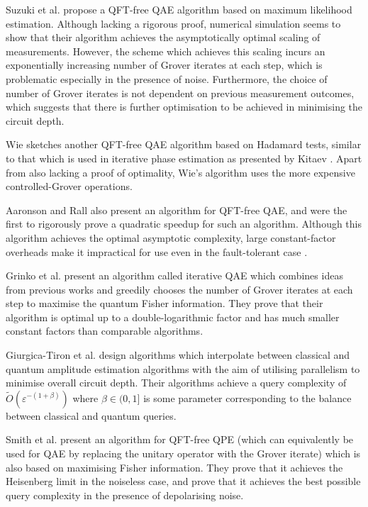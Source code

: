 Suzuki et al. \cite{Amplitude estimation without phase estimation} propose a QFT-free QAE algorithm based on maximum likelihood estimation. Although lacking a rigorous proof, numerical simulation seems to show that their algorithm achieves the asymptotically optimal scaling of measurements. However, the scheme which achieves this scaling incurs an exponentially increasing number of Grover iterates at each step, which is problematic especially in the presence of noise. Furthermore, the choice of number of Grover iterates is not dependent on previous measurement outcomes, which suggests that there is further optimisation to be achieved in minimising the circuit depth.

Wie \cite{Simpler Quantum Counting} sketches another QFT-free QAE algorithm based on Hadamard tests, similar to that which is used in iterative phase estimation as presented by Kitaev \cite{Quantum measurements and the Abelian Stabilizer Problem}. Apart from also lacking a proof of optimality, Wie's algorithm uses the more expensive controlled-Grover operations.

Aaronson and Rall \cite{Quantum Approximate Counting Simplified} also present an algorithm for QFT-free QAE, and were the first to rigorously prove a quadratic speedup for such an algorithm. Although this algorithm achieves the optimal asymptotic complexity, large constant-factor overheads make it impractical for use even in the fault-tolerant case \cite{Iterative quantum amplitude estimation}.

Grinko et al. \cite{Iterative quantum amplitude estimation} present an algorithm called iterative QAE which combines ideas from previous works and greedily chooses the number of Grover iterates at each step to maximise the quantum Fisher information. They prove that their algorithm is optimal up to a double-logarithmic factor and has much smaller constant factors than comparable algorithms.

Giurgica-Tiron et al. \cite{Low depth algorithms for quantum amplitude estimation} design algorithms which interpolate between classical and quantum amplitude estimation algorithms with the aim of utilising parallelism to minimise overall circuit depth. Their algorithms achieve a query complexity of $ \tilde{O} \left( \varepsilon^{-(1 + \beta)} \right) $ where $\beta \in (0,1]$ is some parameter corresponding to the balance between classical and quantum queries.

Smith et al. \cite{An adaptive Bayesian quantum algorithm for phase estimation} present an algorithm for QFT-free QPE (which can equivalently be used for QAE by replacing the unitary operator with the Grover iterate) which is also based on maximising Fisher information. They prove that it achieves the Heisenberg limit in the noiseless case, and prove that it achieves the best possible query complexity in the presence of depolarising noise.

